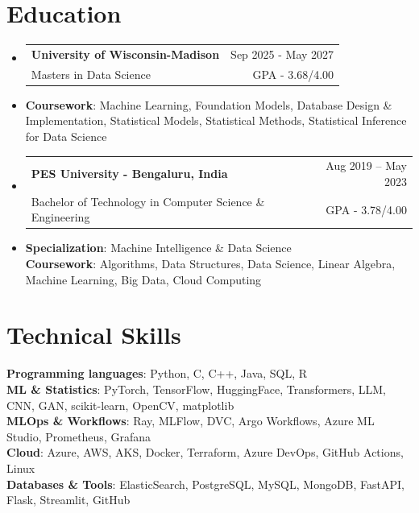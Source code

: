 \documentclass[letterpaper,11pt]{article}
\makeatletter
\newcommand{\resumeItem}[1]{
  \item\small{
    {#1 \vspace{-2pt}}
  }
}
\newcommand{\resumeSubheading}[4]{
  \vspace{-2pt}\item
    \begin{tabular*}{0.97\textwidth}[t]{l@{\extracolsep{\fill}}r}
      \textbf{#1} & #2 \\
      \small#3 & \small #4 \\
    \end{tabular*}\vspace{-7pt}
}
\newcommand{\resumeSubHeadingListStart}{\begin{itemize}[leftmargin=0.15in, label={}]}
\newcommand{\resumeSubHeadingListEnd}{\end{itemize}}
\makeatother
\begin{document}
\section{Education}

  \resumeSubHeadingListStart
    \resumeSubheading
      {University of Wisconsin-Madison}{Sep 2025 - May 2027}
      {Masters in Data Science}{GPA - 3.68/4.00}       
      \resumeItem{\textbf{Coursework}: Machine Learning, Foundation Models, Database Design \& Implementation, Statistical Models, Statistical Methods, Statistical Inference for Data Science}
    
    \resumeSubheading
      {PES University - Bengaluru, India }{Aug 2019 -- May 2023}
      {Bachelor of Technology in Computer Science \& Engineering}{GPA - 3.78/4.00}
      \resumeItem{\textbf{Specialization}: Machine Intelligence \& Data Science \\ \textbf{Coursework}: Algorithms, Data Structures, Data Science, Linear Algebra, Machine Learning, Big Data, Cloud Computing}
    
  \resumeSubHeadingListEnd

\section{Technical Skills}
 \begin{itemize}[leftmargin=0.15in, label={}]
    \small{\item{
     \textbf{Programming languages}{: Python, C, C++, Java, SQL, R} \\ \vspace{0.2pt}
     \textbf{ML \& Statistics}{: PyTorch, TensorFlow, HuggingFace, Transformers, LLM, CNN, GAN, scikit-learn, OpenCV, matplotlib} \\ \vspace{0.2pt}
     \textbf{MLOps \& Workflows}{: Ray, MLFlow, DVC, Argo Workflows, Azure ML Studio, Prometheus, Grafana} \\ \vspace{0.2pt}
     \textbf{Cloud}{: Azure, AWS, AKS, Docker, Terraform, Azure DevOps, GitHub Actions, Linux} \\ \vspace{0.2pt}
     \textbf{Databases \& Tools}{: ElasticSearch, PostgreSQL, MySQL, MongoDB, FastAPI, Flask, Streamlit, GitHub}
     }}
 \end{itemize}


\end{document}
